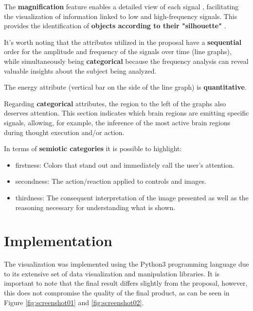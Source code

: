 \documentclass[format=sigconf]{acmart}
\begin{document}
		\par The \textbf{magnification} feature enables a detailed view of each signal \cite{tufte1983visual}, facilitating the visualization of information linked to low and high-frequency signals. This provides the identification of \textbf{objects according to their "silhouette"} \cite{tufte2006beautiful}.\newline
		
		\par It's worth noting that the attributes utilized in the proposal have a \textbf{sequential} \cite{kirk2012data} order for the amplitude and frequency of the signals over time (line graphs), while simultaneously being \textbf{categorical} \cite{kirk2012data} because the frequency analysis can reveal valuable insights about the subject being analyzed.\newline
		
		\par The energy attribute (vertical bar on the side of the line graph) is \textbf{quantitative}.\newline
		
		\par Regarding \textbf{categorical} attributes, the region to the left of the graphs also deserves attention. This section indicates which brain regions are emitting specific signals, allowing, for example, the inference of the most active brain regions during thought execution and/or action.\newline
		
		
		\par In terms of \textbf{semiotic categories} \cite{santaella2017semiotica} it is possible to highlight:
		\begin{itemize}
			\item firstness: Colors that stand out and immediately call the user's attention.
			\item secondness: The action/reaction applied to controls and images.
			\item thirdness: The consequent interpretation of the image presented as well as the reasoning necessary for understanding what is shown.
		\end{itemize}
		
	\section{Implementation}
		\par The visualization was implemented using the Python3 \cite{Python3} programming language due to its extensive set of data visualization and manipulation libraries. It is important to note that the final result differs slightly from the proposal, however, this does not compromise the quality of the final product, as can be seen in Figure \ref{fig:screenshot01} and \ref{fig:screenshot02}.
		
\end{document}
